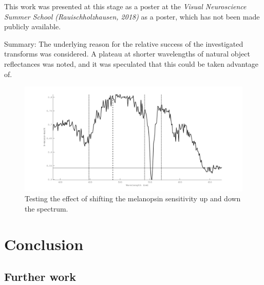 This work was presented at this stage as a poster at the \emph{Visual Neuroscience Summer School (Rauischholzhausen, 2018)} as a poster, which has not been made publicly available.

Summary: The underlying reason for the relative success of the investigated transforms was considered. A plateau at shorter wavelengths of natural object reflectances was noted, and it was speculated that this could be taken advantage of.

\begin{figure}[htbp]
 \includegraphics[max width=\textwidth]{figs/comp/melcomp_9/5a_diffMel.png}
 \caption{Testing the effect of shifting the melanopsin sensitivity up and down the spectrum.}
 \label{fig:9opt}
\end{figure} 


\section{Conclusion}

\subsection{Further work}

